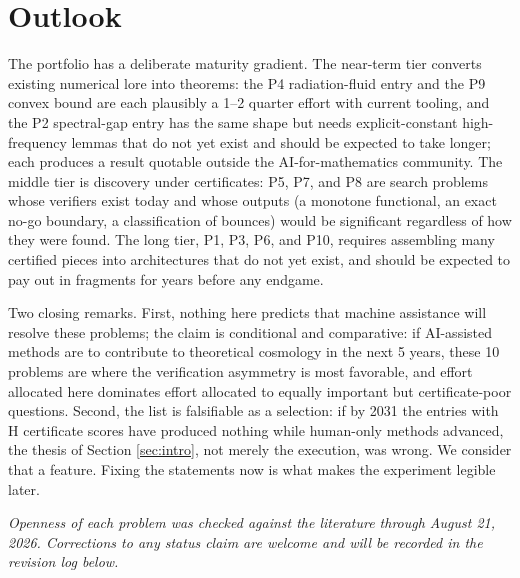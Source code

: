 \documentclass[11pt,letterpaper]{article}
\newcommand{\HH}{H}
\begin{document}
\section{Outlook}
\label{sec:outlook}

The portfolio has a deliberate maturity gradient. The near-term tier converts existing numerical lore into theorems: the P4 radiation-fluid entry and the P9 convex bound are each plausibly a 1--2 quarter effort with current tooling, and the P2 spectral-gap entry has the same shape but needs explicit-constant high-frequency lemmas that do not yet exist and should be expected to take longer; each produces a result quotable outside the AI-for-mathematics community. The middle tier is discovery under certificates: P5, P7, and P8 are search problems whose verifiers exist today and whose outputs (a monotone functional, an exact no-go boundary, a classification of bounces) would be significant regardless of how they were found. The long tier, P1, P3, P6, and P10, requires assembling many certified pieces into architectures that do not yet exist, and should be expected to pay out in fragments for years before any endgame.

Two closing remarks. First, nothing here predicts that machine assistance will resolve these problems; the claim is conditional and comparative: if AI-assisted methods are to contribute to theoretical cosmology in the next 5 years, these 10 problems are where the verification asymmetry is most favorable, and effort allocated here dominates effort allocated to equally important but certificate-poor questions. Second, the list is falsifiable as a selection: if by 2031 the entries with \HH{} certificate scores have produced nothing while human-only methods advanced, the thesis of Section \ref{sec:intro}, not merely the execution, was wrong. We consider that a feature. Fixing the statements now is what makes the experiment legible later.

\vspace{4pt}
\noindent\textit{Openness of each problem was checked against the literature through August 21, 2026. Corrections to any status claim are welcome and will be recorded in the revision log below.}
\end{document}
